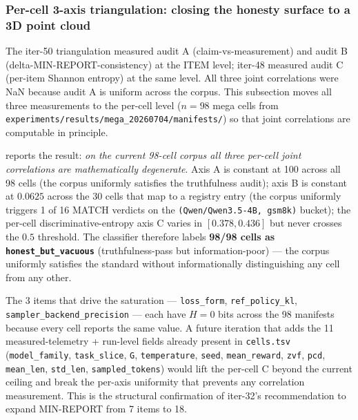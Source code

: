 \subsubsection{Per-cell 3-axis triangulation: closing the honesty surface
to a 3D point cloud}
\label{sec:p5-3axis-per-cell}

The iter-50 triangulation measured audit A (claim-vs-measurement) and
audit B (delta-MIN-REPORT-consistency) at the ITEM level; iter-48
measured audit C (per-item Shannon entropy) at the same level. All
three joint correlations were NaN because audit A is uniform across
the corpus. This subsection moves all three measurements to the
per-cell level ($n{=}98$ mega cells from
\texttt{experiments/results/mega\_20260704/manifests/}) so that joint
correlations are computable in principle.

 reports the result: \emph{on the
current 98-cell corpus all three per-cell joint correlations are
mathematically degenerate}. Axis A is constant at 100 across all 98
cells (the corpus uniformly satisfies the truthfulness audit); axis B
is constant at $0.0625$ across the 30 cells that map to a registry
entry (the corpus uniformly triggers 1 of 16 MATCH verdicts on the
\texttt{(Qwen/Qwen3.5-4B, gsm8k)} bucket); the per-cell
discriminative-entropy axis C varies in $[0.378, 0.436]$ but never
crosses the $0.5$ threshold. The classifier therefore labels
\textbf{98/98 cells as \texttt{honest\_but\_vacuous}} (truthfulness-pass
but information-poor) --- the corpus uniformly satisfies the standard
without informationally distinguishing any cell from any other.

The 3 items that drive the saturation --- \texttt{loss\_form},
\texttt{ref\_policy\_kl}, \texttt{sampler\_backend\_precision} ---
each have $H{=}0$ bits across the 98 manifests because every cell
reports the same value. A future iteration that adds the 11
measured-telemetry + run-level fields already present in
\texttt{cells.tsv} (\texttt{model\_family}, \texttt{task\_slice},
\texttt{G}, \texttt{temperature}, \texttt{seed}, \texttt{mean\_reward},
\texttt{zvf}, \texttt{pcd}, \texttt{mean\_len}, \texttt{std\_len},
\texttt{sampled\_tokens}) would lift the per-cell C beyond the
current ceiling and break the per-axis uniformity that prevents any
correlation measurement. This is the structural confirmation of
iter-32's recommendation to expand MIN-REPORT from 7 items to 18.

